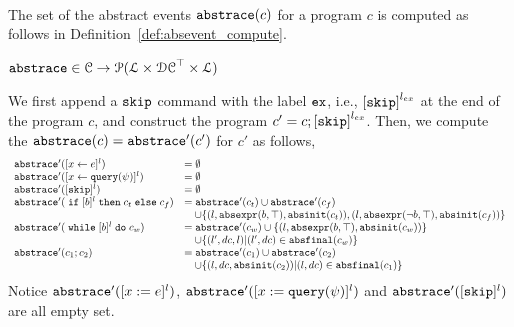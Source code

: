 \\
The set of the abstract events $\mathtt{abs}{\mathtt{trace}}(c)$ for a program $c$
is computed as follows in Definition~\ref{def:absevent_compute}.
 \begin{defn}
 \label{def:absevent_compute}
  $\mathtt{abs}{\mathtt{trace}} \in \mathcal{C} \to \mathcal{P}( \mathcal{L} \times \mathcal{DC}^{\top} \times \mathcal{L} )$
  \end{defn}
 We first append a $\mathtt{skip}$ command with 
the label $\mathtt{ex}$, i.e., $\clabel{\eskip}^{l_{ex}}$ at the end of the program $c$, and construct 
the program $c' = c;\clabel{\eskip}^{l_{ex}}$.
Then, we compute the $\mathtt{abs}{\mathtt{trace}}(c) = \mathtt{abs}{\mathtt{trace}}'(c')$ for $c'$ as follows,
 {\footnotesize
 \[
   \begin{array}{ll}
      \absflow'(\clabel{\assign{x}{\expr}}{}^l)  & = \emptyset  \\
      \absflow'(\clabel{\assign{x}{\query(\qexpr)}}{}^l)  & = \emptyset  \\
      \absflow'([\eskip]^{l})  & = \emptyset \\
      \absflow'(\eif [b]^l \ethen c_t \eelse c_f)  & =  \absflow'(c_t) \cup \absflow'(c_f)
        \\ & \quad 
        \cup \{(l, \absexpr(\bexpr, \top),  \absinit(c_t) ) ,  (l, \absexpr(\neg\bexpr, \top), \absinit(c_f)) \} \\
       \absflow'(\ewhile [b]^l \edo c_w)  & =  \absflow'(c_w) \cup \{(l, \absexpr(\bexpr, \top), \absinit(c_w)) \} 
       \\ & \quad 
       \cup \{(l', dc, l)| (l', dc) \in \absfinal(c_w) \} \\
       \absflow'(c_1 ; c_2)  & = \absflow'(c_1) \cup  \absflow'(c_2) 
       \\ & \quad 
       \cup \{ (l, dc, \absinit(c_2)) | (l, dc) \in \absfinal(c_1) \} \\
   \end{array}
   \]
   }
   Notice $\mathtt{abs}{\mathtt{trace}}'([x := e]^{l})$, $\mathtt{abs}{\mathtt{trace}}'([x := {\tt query}(\psi)]^{l})$ and $\mathtt{abs}{\mathtt{trace}}'([\mathtt{skip}]^{l})$ are all empty set. 
   
